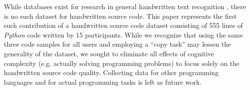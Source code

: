 \documentclass{vgtc}                          %
\begin{document}



While databases exist for research in general handwritten text recognition \cite{marti2002iam, grosicki1rimes}, there is no such dataset for handwritten source code.  This paper represents the first such contribution of a handwritten source code dataset consisting of 555 lines of  \textit{Python} code written by 15 participants. While we recognize that using the same three code samples for all users and employing a ``copy task'' may lessen the generality of the dataset, we sought to eliminate all effects of cognitive complexity (e.g. actually solving programming problems) to focus solely on the handwritten source code quality.  Collecting data for other programming languages and for actual programming tasks is left as future work.

\end{document}

